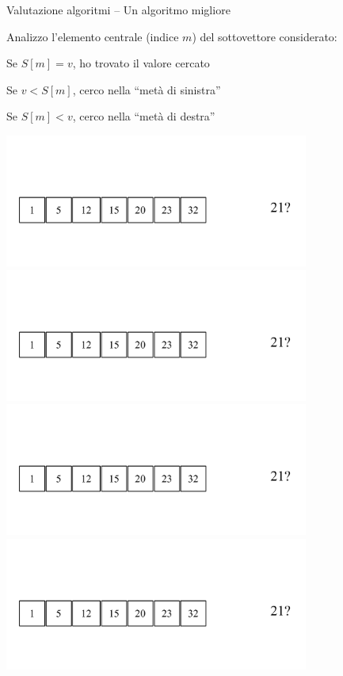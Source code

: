 \begin{frame}{Valutazione algoritmi -- Un algoritmo migliore}

\vspace{-9pt}
\begin{myboxtitle}
Analizzo l'elemento centrale (indice $m$) del sottovettore considerato:

\BIL
  \item Se $S[m]=v$, ho trovato il valore cercato
  \item Se $v<S[m]$, cerco nella “metà di sinistra”
  \item Se $S[m]<v$, cerco nella “metà di destra”
\EIL
\end{myboxtitle}

\vspace{-24pt}
\begin{overprint}
\centering\includegraphics[width=10cm,page=1]{binarysearch.pdf}
\centering\includegraphics[width=10cm,page=2]{binarysearch.pdf}
\centering\includegraphics[width=10cm,page=3]{binarysearch.pdf}
\centering\includegraphics[width=10cm,page=4]{binarysearch.pdf}

\end{overprint}
\end{frame}
